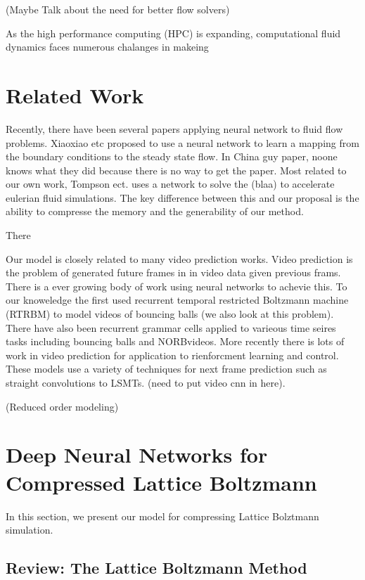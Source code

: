 \documentclass{article}
\begin{document}
(Maybe Talk about the need for better flow solvers)

As the high performance computing (HPC) is expanding, computational fluid dynamics faces numerous chalanges in makeing 


\section{Related Work}

Recently, there have been several papers applying neural network to fluid flow problems. Xiaoxiao etc \cite{guo2016convolutional} proposed to use a neural network to learn a mapping from the boundary conditions to the steady state flow. In China guy paper, noone knows what they did because there is no way to get the paper. Most related to our own work, Tompson ect. \cite{tompson2016accelerating} uses a network to solve the (blaa) to accelerate eulerian fluid simulations. The key difference between this and our proposal is the ability to compresse the memory and the generability of our method.

There

Our model is closely related to many video prediction works. Video prediction is the problem of generated future frames in in video data given previous frams. There is a ever growing body of work using neural networks to achevie this. To our knoweledge the first used recurrent temporal restricted Boltzmann machine (RTRBM) to model videos of bouncing balls (we also look at this problem). There have also been recurrent grammar cells applied to varieous time seires tasks including bouncing balls and NORBvideos. More recently there is lots of work in video prediction for application to rienforcment learning and control. These models use a variety of techniques for next frame prediction such as straight convolutions  to LSMTs. (need to put video cnn in here).

(Reduced order modeling)

\section{Deep Neural Networks for Compressed Lattice Boltzmann}

In this section, we present our model for compressing Lattice Bolztmann simulation.

\subsection{Review: The Lattice Boltzmann Method}
\end{document}
